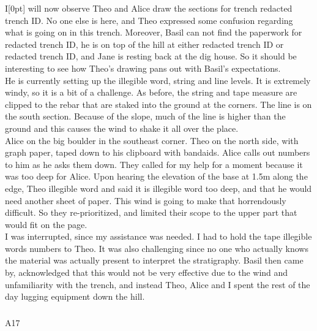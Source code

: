 \documentclass[
]{article}
\makeatletter
\let\oldsubparagraph\subparagraph
\renewcommand{\subparagraph}{
    \@ifstar
      \xxxSubParagraphStar
      \xxxSubParagraphNoStar
  }
\newcommand{\xxxSubParagraphStar}[1]{\oldsubparagraph*{#1}\mbox{}}
\newcommand{\xxxSubParagraphNoStar}[1]{\oldsubparagraph{#1}\mbox{}}
\newcommand{\paragraphnumber}[1]{\marginnote{\color{lightgray}\tiny{#1}}[0pt]}
\makeatother
\begin{document}
I\paragraphnumber{[110]} will now observe Theo and Alice draw the
sections for trench redacted trench ID. No one else is here, and Theo
expressed some confusion regarding what is going on in this trench.
Moreover, Basil can not find the paperwork for redacted trench ID, he is
on top of the hill at either redacted trench ID or redacted trench ID,
and Jane is resting back at the dig house. So it should be interesting
to see how Theo's drawing pans out with Basil's expectations.\\
He is currently setting up the illegible word, string and line levels.
It is extremely windy, so it is a bit of a challenge. As before, the
string and tape measure are clipped to the rebar that are staked into
the ground at the corners. The line is on the south section. Because of
the slope, much of the line is higher than the ground and this causes
the wind to shake it all over the place.\\
Alice on the big boulder in the southeast corner. Theo on the north
side, with graph paper, taped down to his clipboard with bandaids. Alice
calls out numbers to him as he asks them down. They called for my help
for a moment because it was too deep for Alice. Upon hearing the
elevation of the base at 1.5m along the edge, Theo illegible word and
said it is illegible word too deep, and that he would need another sheet
of paper. This wind is going to make that horrendously difficult. So
they re-prioritized, and limited their scope to the upper part that
would fit on the page.\\
I was interrupted, since my assistance was needed. I had to hold the
tape illegible words numbers to Theo. It was also challenging since no
one who actually knows the material was actually present to interpret
the stratigraphy. Basil then came by, acknowledged that this would not
be very effective due to the wind and unfamiliarity with the trench, and
instead Theo, Alice and I spent the rest of the day lugging equipment
down the hill.

\subparagraph{A17}\label{sec-A17}
\end{document}
